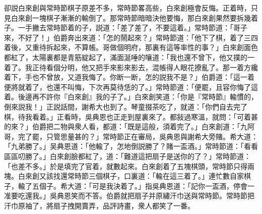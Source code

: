 卻説白來創與常時節棋子原差不多，常時節畧高些，白來創極會反悔。正着時，只見白來創一塊棋子漸漸的輸倒了。那常時節暗暗決他要悔，那白來創果然要拆幾着子。一手撇去常時節着的子，説道：「差了差了，不要這着。」常時節道：「哥子來，不好了！」伯爵奔出來道：「怎的鬧起來？」常時節道：「他下了棋，着了三四着後，又重待拆起來，不算帳。哥做個明府，那裏有這等率性的事？」白來創面色都紅了，太陽裏都是青筋綻起了，滿面涎唾的嚷道：「我也還不曾下，他又撲的一着了。我正待看個分明，他又把手來影來影去，混帳得人眼花撩亂了。那一着方纔着下，手也不曾放，又道我悔了。你断一断，怎的説我不是？」伯爵道：「這一着便將就着了，也還不叫悔，下次再莫待恁的了。」常時節道：「便罷，且容你悔了這着。後邊再不許你『白來創』我的子了。」白來創笑道：「你是『常時節』輸慣的，倒來説我！」正説話間，謝希大也到了。琴童掇茶吃了，就道：「你們自去完了棋，待我看着。」正看時，吳典恩也正走到屋裏來了。都敍過寒溫，就問：「可着甚的來？」伯爵把二物與衆人看，都道：「既是這般，須着完了。」白來創道：「九阿哥，完了罷，只管思量甚的？」常時節正在審局，吳典恩與謝希大旁賭。希大道：「九弟勝了。」吴典恩道：「他輸了，怎地倒説勝了？賭一盃酒。」常時節道：「看看區區叨勝了。」白來創臉都紅了，道：「難道這把扇子是送你的了？」常時節道：「也差不多。」於是填完了官着，就數起來。白來創着了五塊棋頭，常時節只得兩塊。白來創又該找還常時節三個棋子，口裏道：「輸在這三着了。」連忙數自家棋子，輸了五個子。希大道：「可是我決着了。」指吳典恩道：「記你一盃酒，停會一准要吃還我。」吳典恩笑而不答。伯爵就把扇子并原繡汗巾送與常時節。常時節把汗巾原袖了，將扇子拽開賣弄，品評詩畫，衆人都笑了一番。

